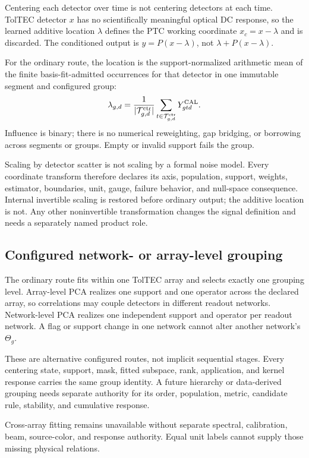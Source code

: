 \documentclass[11pt]{article}
\begin{document}
Centering each detector over time is not centering detectors at each time.
TolTEC detector $x$ has no scientifically meaningful optical DC response, so
the learned additive location $\lambda$ defines the PTC working coordinate
$x_c=x-\lambda$ and is discarded. The conditioned output is
$y=P(x-\lambda)$, not $\lambda+P(x-\lambda)$.

For the ordinary route, the location is the support-normalized arithmetic
mean of the finite basis-fit-admitted occurrences for that detector in one
immutable segment and configured group:
\[
\lambda_{g,d}=
\frac{1}{|\mathcal T^{\rm ctr}_{g,d}|}
\sum_{t\in\mathcal T^{\rm ctr}_{g,d}}Y^{\rm CAL}_{gtd}.
\]
Influence is binary; there is no numerical reweighting, gap bridging, or
borrowing across segments or groups. Empty or invalid support fails the group.

Scaling by detector scatter is not scaling by a formal noise model. Every
coordinate transform therefore declares its axis, population, support,
weights, estimator, boundaries, unit, gauge, failure behavior, and null-space
consequence. Internal invertible scaling is restored before ordinary output;
the additive location is not. Any other noninvertible transformation changes
the signal definition and needs a separately named product role.

\subsection{Configured network- or array-level grouping}

The ordinary route fits within one TolTEC array and selects exactly one
grouping level. Array-level PCA realizes one support and one operator across
the declared array, so correlations may couple detectors in different
readout networks. Network-level PCA realizes one independent support and
operator per readout network. A flag or support change in one network cannot
alter another network's $\Theta_g$.

These are alternative configured routes, not implicit sequential stages.
Every centering state, support, mask, fitted subspace, rank, application, and
kernel response carries the same group identity. A future hierarchy or
data-derived grouping needs separate authority for its order, population,
metric, candidate rule, stability, and cumulative response.

Cross-array fitting remains unavailable without separate spectral,
calibration, beam, source-color, and response authority. Equal unit labels
cannot supply those missing physical relations.
\end{document}
